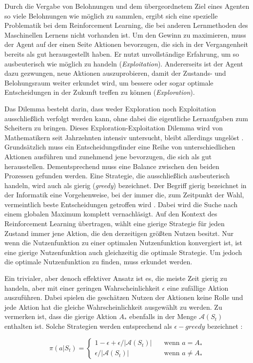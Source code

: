 Durch die Vergabe von Belohnungen und dem übergeordnetem Ziel eines Agenten so viele Belohnungen wie möglich zu sammlen, ergibt sich eine spezielle Problematik bei dem Reinforcement Learning, die bei anderen Lernmethoden des Maschinellen Lernens nicht vorhanden ist. Um den Gewinn zu maximieren, muss der Agent auf der einen Seite Aktionen bevorzugen, die sich in der Vergangenheit bereits als gut herausgestellt haben. Er nutzt unvollständige Erfahrung, um so ausbeuterisch wie möglich zu handeln (\textit{Exploitation}). Andererseits ist der Agent dazu gezwungen, neue Aktionen auszuprobieren, damit der Zustands- und Belohungsraum weiter erkundet wird, um bessere oder sogar optimale Entscheidungen in der Zukunft treffen zu können (\textit{Exploration}). 
\par 
Das Dilemma besteht darin, dass weder Exploration noch Exploitation ausschließlich verfolgt werden kann, ohne dabei die eigentliche Lernaufgaben zum Scheitern zu bringen. Dieses Exploration-Exploitation Dilemma wird von Mathematikern seit Jahrzehnten intensiv untersucht, bleibt allerdings ungelöst \cite[S.~3]{Sutton1998}. Grundsätzlich muss ein Entscheidungsfinder  eine Reihe von unterschiedlichen Aktionen ausführen und zunehmend jene bevorzugen, die sich als gut herausstellen. Dementsprechend muss eine Balance zwischen den beiden Prozessen gefunden werden.
Eine Strategie, die ausschließlich ausbeuterisch handeln, wird auch als gierig (\textit{greedy}) bezeichnet. Der Begriff \glqq gierig\grqq{} bezeichnet in der Informatik eine Vorgehenweise, bei der immer die, zum Zeitpunkt der Wahl, vermeintlich beste Entscheidungen getroffen wird \cite[S.~203]{greedy}. Dabei wird die Suche nach einem globalen Maximum komplett vernachläsigt. Auf den Kontext des Reinforcement Learning übertragen, wählt eine gierige Strategie für jeden Zustand immer jene Aktion, die den derzeitigen größten Nutzen besitzt. Nur wenn die Nutzenfunktion zu einer optimalen Nutzenfunktion konvergiert ist, ist eine gierige Nutzenfunktion auch gleichzeitig die optimale Strategie. Um jedoch die optimale Nutzenfunktion zu finden, muss erkundet werden.
\par
Ein trivialer, aber denoch effektiver Ansatz ist es, die meiste Zeit gierig zu handeln, aber mit einer geringen Wahrscheinlichkeit $\epsilon$ eine zufällige Aktion auszuführen. Dabei spielen die geschätzen Nutzen der Aktionen keine Rolle und jede Aktion hat die gleiche Wahrscheinlichkeit ausgewählt zu werden. Zu vermerken ist, dass die gierige Aktion $A_*$ ebenfalls in der Menge $\mathcal{A}(S_t)$ enthalten ist. Solche Strategien werden entsprechend als $\epsilon-greedy$ bezeichnet \cite[S.~28]{Sutton1998}:

\begin{equation}\label{eq:greedyProbs}
    \pi(a|S_t) =   
        \begin{cases}
            1-\epsilon + \epsilon / |\mathcal{A}(S_t)|      & \quad \text{wenn } a = A_* \\
            \epsilon / |\mathcal{A}(S_t)|  & \quad \text{wenn } a \neq A_*
        \end{cases}
\end{equation}